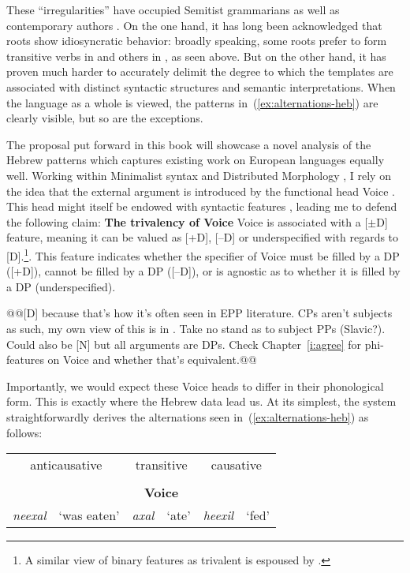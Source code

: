 These ``irregularities'' have occupied Semitist grammarians as well as contemporary authors \citep{doron03,arad05,borer13oup,kastner16phd}. On the one hand, it has long been acknowledged that roots show idiosyncratic behavior: broadly speaking, some roots prefer to form transitive verbs in {\tkal} and others in {\tpie}, as seen above. But on the other hand, it has proven much harder to accurately delimit the degree to which the templates are associated with distinct syntactic structures and semantic interpretations. When the language as a whole is viewed, the patterns in~(\ref{ex:alternations-heb}) are clearly visible, but so are the exceptions.

The proposal put forward in this book will showcase a novel analysis of the Hebrew patterns which captures existing work on European languages equally well. Working within Minimalist syntax \citep{chomsky95} and Distributed Morphology \citep{dm}, I rely on the idea that the external argument is introduced by the functional head Voice \citep{kratzer96,pylkkanen08,woodmarantz17}. This head might itself be endowed with syntactic features \citep{schaefer08,wood15springer}, leading me to defend the following claim:
\pex \textbf{The trivalency of Voice}
	\a Voice is associated with a [$\pm$D] feature, meaning it can be valued as [+D], [--D] or underspecified with regards to [D].\footnote{A similar view of binary features as trivalent is espoused by \cite{harbour11}.}.
	\a This feature indicates whether the specifier of Voice must be filled by a DP ([+D]), cannot be filled by a DP ([--D]), or is agnostic as to whether it is filled by a DP (underspecified).
\xe

@@[D] because that's how it's often seen in EPP literature. CPs aren't subjects as such, my own view of this is in \cite{kastner15lingua}. Take no stand as to subject PPs (Slavic?). Could also be [N] but all arguments are DPs. Check Chapter~\ref{i:agree} for phi-features on Voice and whether that's equivalent.@@

Importantly, we would expect these Voice heads to differ in their phonological form. This is exactly where the Hebrew data lead us. At its simplest, the system straightforwardly derives the alternations seen in~(\ref{ex:alternations-heb}) as follows:
\ex\label{ex:alternations-heb2}
	\begin{tabular}{llllll}
	\multicolumn{2}{c}{anticausative}	&	\multicolumn{2}{c}{transitive}	& \multicolumn{2}{c}{causative}\\
	\multicolumn{2}{c}{\tnif}	&	\multicolumn{2}{c}{\tkal}	& \multicolumn{2}{c}{\thif}\\
	\multicolumn{2}{c}{\textbf{\vz}}	&	\multicolumn{2}{c}{\textbf{Voice}}	& \multicolumn{2}{c}{\textbf{\vd}}\\
	\emph{neexal}	& `was eaten'	&	\emph{axal}	& `ate'	&	\emph{heexil}	& `fed'\\
	\end{tabular}
\xe

